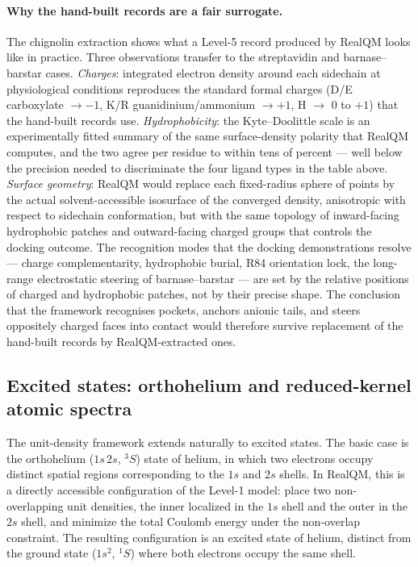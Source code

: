 \documentclass[11pt]{article}
\begin{document}
\paragraph{Why the hand-built records are a fair surrogate.}
The chignolin extraction shows what a Level-5 record produced by RealQM looks like in practice. Three observations transfer to the streptavidin and barnase--barstar cases. \emph{Charges}: integrated electron density around each sidechain at physiological conditions reproduces the standard formal charges (D/E carboxylate $\to -1$, K/R guanidinium/ammonium $\to +1$, H $\to$ 0 to $+1$) that the hand-built records use. \emph{Hydrophobicity}: the Kyte--Doolittle scale is an experimentally fitted summary of the same surface-density polarity that RealQM computes, and the two agree per residue to within tens of percent --- well below the precision needed to discriminate the four ligand types in the table above. \emph{Surface geometry}: RealQM would replace each fixed-radius sphere of points by the actual solvent-accessible isosurface of the converged density, anisotropic with respect to sidechain conformation, but with the same topology of inward-facing hydrophobic patches and outward-facing charged groups that controls the docking outcome. The recognition modes that the docking demonstrations resolve --- charge complementarity, hydrophobic burial, R84 orientation lock, the long-range electrostatic steering of barnase--barstar --- are set by the relative positions of charged and hydrophobic patches, not by their precise shape. The conclusion that the framework recognises pockets, anchors anionic tails, and steers oppositely charged faces into contact would therefore survive replacement of the hand-built records by RealQM-extracted ones.

\subsection{Excited states: orthohelium and reduced-kernel atomic spectra}\label{sec:orthohelium}

The unit-density framework extends naturally to excited states. The basic case is the orthohelium ($1s\,2s$, $^3S$) state of helium, in which two electrons occupy distinct spatial regions corresponding to the $1s$ and $2s$ shells. In RealQM, this is a directly accessible configuration of the Level-1 model: place two non-overlapping unit densities, the inner localized in the $1s$ shell and the outer in the $2s$ shell, and minimize the total Coulomb energy under the non-overlap constraint. The resulting configuration is an excited state of helium, distinct from the ground state ($1s^2$, $^1S$) where both electrons occupy the same shell.
\end{document}
